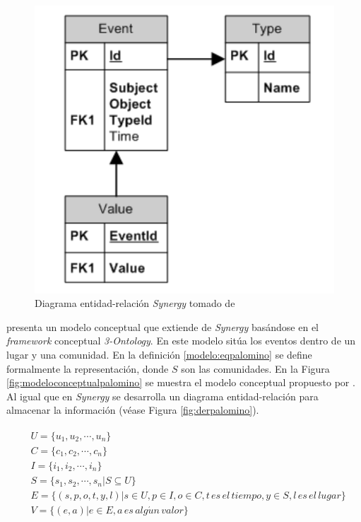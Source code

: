 \begin{figure}[tp]
	\centering
	\includegraphics[scale=.3]{images/dersynergy.png}
	\caption{Diagrama entidad-relación \textit{Synergy} tomado de \citep{Babar:2010}}
	\label{fig:dersynergy}
\end{figure}


\cite{Palomino:2012} presenta un modelo conceptual que extiende de \textit{Synergy} basándose en el \textit{framework} conceptual \textit{3-Ontology}. En este modelo sitúa los eventos dentro de un lugar y una comunidad. En la definición \ref{modelo:eqpalomino} se define formalmente la representación, donde $S$ son las comunidades. En la Figura \ref{fig:modeloconceptualpalomino} se muestra el modelo conceptual propuesto por \cite{Palomino:2012}. Al igual que en \textit{Synergy} se desarrolla un diagrama entidad-relación para almacenar la información (véase Figura \ref{fig:derpalomino}).

\begin{equation}
\label{modelo:eqpalomino}
\begin{split}
\begin{aligned}
	&U = \{u_1, u_2,\cdots,u_n\}\\
	&C = \{c_1, c_2,\cdots,c_n\}\\
	&I = \{i_1, i_2,\cdots,i_n\}\\
	&S = \{s_1, s_2,\cdots,s_n|S\subseteq U\}\\
	&E = \{(s, p, o, t, y, l) | s\in U, p \in I, o \in C, t\, es\, el\, tiempo, y \in S, l\, es\, el\, lugar\}\\
	&V = \{(e, a) | e \in E, a\, es\, alg\acute{u}n\, valor\}
\end{aligned}
\end{split}
\end{equation}

